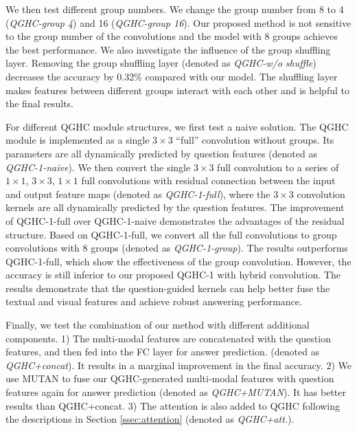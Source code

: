 \documentclass[runningheads]{llncs}
\begin{document}
We then test different group numbers. We change the group number from 8 to 4 (\emph{QGHC-group 4}) and 16 (\emph{QGHC-group 16}). Our proposed method is not sensitive to the group number of the convolutions and the model with 8 groups achieves the best performance. 
We also investigate the influence of the group shuffling layer.
Removing the group shuffling layer (denoted as \emph{QGHC-w/o shuffle}) decreases the accuracy by 0.32\% compared with our model. The shuffling layer makes features between different groups interact with each other and is helpful to the final results.

For different QGHC module structures, we first test a naive solution. The QGHC module is implemented as a single $3 \times 3$ ``full'' convolution without groups. Its parameters are all dynamically predicted by question features (denoted as \emph{QGHC-1-naive}). We then convert the single $3 \times 3$ full convolution to a series of $1 \times 1$, $3 \times 3$, $1 \times 1$ full convolutions with residual connection between the input and output feature maps (denoted as \emph{QGHC-1-full}), where the $3\times 3$ convolution kernels are all dynamically predicted by the question features. The improvement of QGHC-1-full over QGHC-1-naive demonstrates the advantages of the residual structure. Based on QGHC-1-full, we convert all the full convolutions to group convolutions with 8 groups (denoted as \emph{QGHC-1-group}). The results outperforms QGHC-1-full, which show the effectiveness of the group convolution. 
However, the accuracy is still inferior to our proposed QGHC-1 with hybrid convolution. The results demonstrate that the question-guided kernels can help better fuse the textual and visual features and achieve robust answering performance. 

Finally, we test the combination of our method with different additional components. 1) The multi-modal features are concatenated with the question features, and then fed into the FC layer for answer prediction. (denoted as \emph{QGHC+concat}). It results in a marginal improvement in the final accuracy. 2) We use MUTAN \cite{ben2017mutan} to fuse our QGHC-generated multi-modal features with question features again for answer prediction (denoted as \emph{QGHC+MUTAN}). It has better results than QGHC+concat. 3) The attention is also added to QGHC following the descriptions in Section \ref{ssec:attention} (denoted as \emph{QGHC+att.}).
\end{document}
